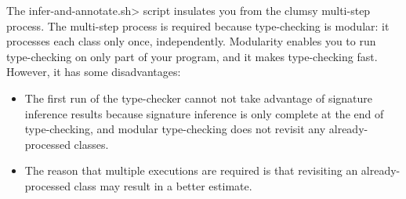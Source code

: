 The \<infer-and-annotate.sh> script insulates you from the
clumsy multi-step process.  The multi-step process
is required because type-checking is modular:
it processes each class only once, independently.  Modularity enables you
to run type-checking on only part of your program, and
it makes type-checking fast.  However, it has some disadvantages:
\begin{itemize}
\item
  The first run of the type-checker cannot not take advantage
  of signature inference results because signature inference is only complete at the
  end of type-checking, and modular type-checking does not revisit any
  already-processed classes.
\item
  The reason that multiple executions are required is that revisiting an
  already-processed class may result in a better estimate.
\end{itemize}



